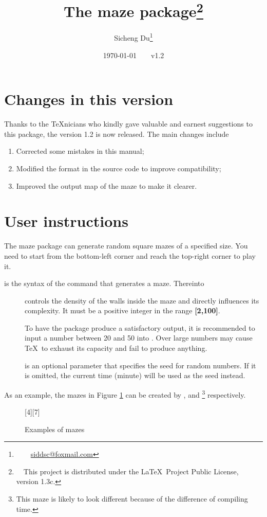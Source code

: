 \documentclass{ltxdoc}
\title{The \textsf{maze} package\footnote{~~This project is distributed under the \LaTeX~Project Public License, version 1.3c.}}
\author{Sicheng Du\thanks{~~\Letter~~\href{mailto:siddsc@foxmail.com}{siddsc@foxmail.com}}}
\date{\today~~~~v1.2}
\begin{document}
\maketitle
\section{Changes in this version}
Thanks to the \TeX nicians who kindly gave valuable and earnest suggestions to this package, the version 1.2 is now released. The main changes include
\begin{enumerate}
\item Corrected some mistakes in this manual;
\item Modified the format in the source code to improve compatibility;
\item Improved the output map of the maze to make it clearer.
\end{enumerate}
\section{User instructions}
The \textsf{maze} package can generate random square mazes of a specified size. You need to start from the bottom-left corner and reach the top-right corner to play it.
\begin{macro}{\maze}
 is the syntax of the command that generates a maze. Thereinto
\begin{description}
\item[] controls the density of the walls inside the maze and directly influences its complexity. It must be a positive integer in the range \textbf{[2,100]}.

To have the package produce a satisfactory output, it is recommended to input a number between 20 and 50 into . Over large numbers may cause \TeX~to exhaust its capacity and fail to produce anything.
\item[] is an optional parameter that specifies the seed for random numbers. If it is omitted, the current time (minute) will be used as the seed instead.
\end{description}\end{macro}

As an example, the mazes in Figure \ref{fig:mazes} can be created by ,  and \footnote{This maze is likely to look different because of the difference of compiling time.} respectively.
\begin{figure}[h]
\centering
{}[4]\hfill{}[7]\hfill{}
\caption{Examples of mazes}\label{fig:mazes}
\end{figure}
\clearpage
\end{document}
